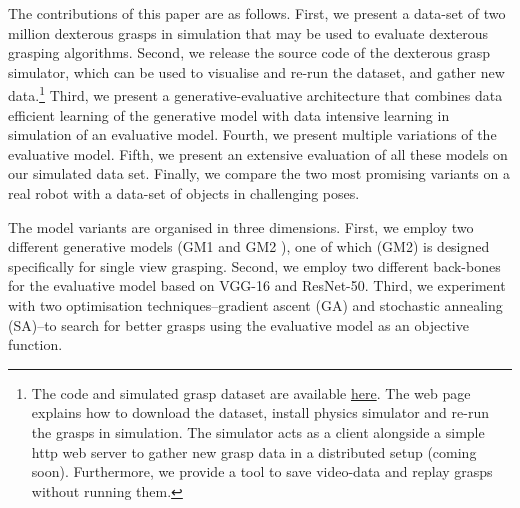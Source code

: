 The contributions of this paper are as follows. First, we present a data-set of two million dexterous grasps in simulation that may be used to evaluate dexterous grasping algorithms. Second, we release the source code of the dexterous grasp simulator, which can be used to visualise and re-run the dataset, and gather new data.\footnote{The code and simulated grasp dataset are available \href{https://rusen.github.io/DDG/}{here}. The web page explains how to download the dataset, install physics simulator and re-run the grasps in simulation. The simulator acts as a client alongside a simple http web server to gather new grasp data in a distributed setup (coming soon). Furthermore, we provide a tool to save video-data and replay grasps without running them.} Third, we present a generative-evaluative architecture that combines data efficient learning of the generative model with data intensive learning in simulation of an evaluative model. Fourth, we present multiple variations of the evaluative model. Fifth, we present an extensive evaluation of all these models on our simulated data set. Finally, we compare the two most promising variants on a real robot with a data-set of objects in challenging poses.

The model variants are organised in three dimensions. First, we employ two different generative models (GM1 \cite{kopicki2015ijrr} and GM2 \cite{kopicki2019ijrr}), one of which (GM2) is designed specifically for single view grasping. Second, we employ two different back-bones for the evaluative model based on VGG-16 and ResNet-50. Third, we experiment with two optimisation techniques--gradient ascent (GA) and stochastic annealing (SA)--to search for better grasps using the evaluative model as an objective function.


